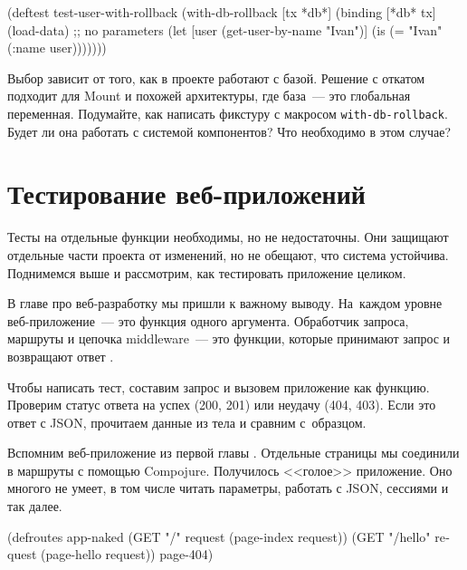 \else

\begin{english}
  \begin{clojure}
(deftest test-user-with-rollback
  (with-db-rollback [tx *db*]
    (binding [*db* tx]
      (load-data) ;; no parameters
      (let [user (get-user-by-name "Ivan")]
        (is (= "Ivan" (:name user)))))))
  \end{clojure}
\end{english}

\fi

Выбор зависит от того, как в проекте работают с базой. Решение с откатом
подходит для Mount и похожей архитектуры, где база~--- это глобальная
переменная. Подумайте, как написать фикстуру с макросом
\verb|with-db-rollback|. Будет ли она работать с системой компонентов? Что
необходимо в этом случае?

\section{Тестирование веб-приложе\-ний}


Тесты на отдельные функции необходимы, но не недостаточны. Они защищают
отдельные части проекта от изменений, но не обещают, что система
устойчива. Поднимемся выше и рассмотрим, как тестировать приложение целиком.

В главе про веб-разработку мы пришли к важному выводу. На~каждом уровне
веб-приложение~--- это функция одного аргумента. Обработчик запроса, маршруты и
цепочка middleware~--- это функции, которые принимают запрос и возвращают
ответ .

Чтобы написать тест, составим запрос и вызовем приложение как функцию. Проверим
статус ответа на успех (200, 201) или неудачу (404, 403). Если это ответ с JSON,
прочитаем данные из тела и сравним с~образцом.

Вспомним веб-приложение из первой главы . Отдельные страницы мы
соединили в маршруты с помощью Compojure. Получилось <<голое>> приложение. Оно
многого не умеет, в том числе читать параметры, работать с JSON, сессиями и так
далее.


\ifnarrow

\begin{english}
  \begin{clojure}
(defroutes app-naked
  (GET "/"
    request (page-index request))
  (GET "/hello"
    request (page-hello request))
  page-404)
  \end{clojure}
\end{english}

